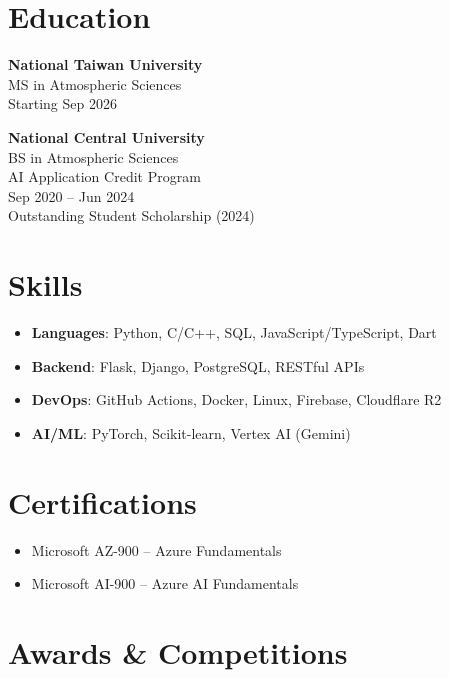 \documentclass[10pt, a4paper]{article}
\begin{document}
\begin{minipage}[t]{0.37\textwidth}

\section{Education}

\noindent\textbf{National Taiwan University}\\
MS in Atmospheric Sciences\\
{\small Starting Sep 2026}\vspace{4pt}

\noindent\textbf{National Central University}\\
BS in Atmospheric Sciences\\
AI Application Credit Program\\
{\small Sep 2020 -- Jun 2024}\\
{\small Outstanding Student Scholarship (2024)}\vspace{4pt}

\section{Skills}

\begin{itemize}
  \item \textbf{Languages}: Python, C/C++, SQL, JavaScript/TypeScript, Dart
  \item \textbf{Backend}: Flask, Django, PostgreSQL, RESTful APIs
  \item \textbf{DevOps}: GitHub Actions, Docker, Linux, Firebase, Cloudflare R2
  \item \textbf{AI/ML}: PyTorch, Scikit-learn, Vertex AI (Gemini)
\end{itemize}\vspace{3pt}

\section{Certifications}

\begin{itemize}
  \item Microsoft AZ-900 -- Azure Fundamentals
  \item Microsoft AI-900 -- Azure AI Fundamentals
\end{itemize}\vspace{3pt}

\section{Awards \& Competitions}


\end{minipage}
\end{document}
